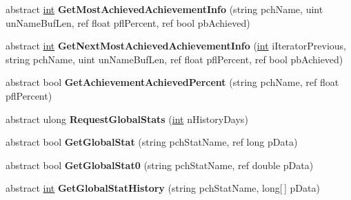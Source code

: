 \begin{DoxyCompactItemize}
\item 
\hypertarget{classValve_1_1Steamworks_1_1ISteamUserStats_adff9e5741c86a450a89ba9b7476c2410}{}abstract \hyperlink{SDL__thread_8h_a6a64f9be4433e4de6e2f2f548cf3c08e}{int} {\bfseries Get\+Most\+Achieved\+Achievement\+Info} (string pch\+Name, uint un\+Name\+Buf\+Len, ref float pfl\+Percent, ref bool pb\+Achieved)\label{classValve_1_1Steamworks_1_1ISteamUserStats_adff9e5741c86a450a89ba9b7476c2410}

\item 
\hypertarget{classValve_1_1Steamworks_1_1ISteamUserStats_ae542684ef06d0d377736624596157659}{}abstract \hyperlink{SDL__thread_8h_a6a64f9be4433e4de6e2f2f548cf3c08e}{int} {\bfseries Get\+Next\+Most\+Achieved\+Achievement\+Info} (\hyperlink{SDL__thread_8h_a6a64f9be4433e4de6e2f2f548cf3c08e}{int} i\+Iterator\+Previous, string pch\+Name, uint un\+Name\+Buf\+Len, ref float pfl\+Percent, ref bool pb\+Achieved)\label{classValve_1_1Steamworks_1_1ISteamUserStats_ae542684ef06d0d377736624596157659}

\item 
\hypertarget{classValve_1_1Steamworks_1_1ISteamUserStats_af2c9c36e3d38b2f6c7d399feb6e7148c}{}abstract bool {\bfseries Get\+Achievement\+Achieved\+Percent} (string pch\+Name, ref float pfl\+Percent)\label{classValve_1_1Steamworks_1_1ISteamUserStats_af2c9c36e3d38b2f6c7d399feb6e7148c}

\item 
\hypertarget{classValve_1_1Steamworks_1_1ISteamUserStats_a91b3928aab4006b8a242a488544d295a}{}abstract ulong {\bfseries Request\+Global\+Stats} (\hyperlink{SDL__thread_8h_a6a64f9be4433e4de6e2f2f548cf3c08e}{int} n\+History\+Days)\label{classValve_1_1Steamworks_1_1ISteamUserStats_a91b3928aab4006b8a242a488544d295a}

\item 
\hypertarget{classValve_1_1Steamworks_1_1ISteamUserStats_a92bf54658104c148284cd754d3491546}{}abstract bool {\bfseries Get\+Global\+Stat} (string pch\+Stat\+Name, ref long p\+Data)\label{classValve_1_1Steamworks_1_1ISteamUserStats_a92bf54658104c148284cd754d3491546}

\item 
\hypertarget{classValve_1_1Steamworks_1_1ISteamUserStats_a19045556c6d6d16e1ee35a12f6a13644}{}abstract bool {\bfseries Get\+Global\+Stat0} (string pch\+Stat\+Name, ref double p\+Data)\label{classValve_1_1Steamworks_1_1ISteamUserStats_a19045556c6d6d16e1ee35a12f6a13644}

\item 
\hypertarget{classValve_1_1Steamworks_1_1ISteamUserStats_a9b0073ff183b57581166d7f689639059}{}abstract \hyperlink{SDL__thread_8h_a6a64f9be4433e4de6e2f2f548cf3c08e}{int} {\bfseries Get\+Global\+Stat\+History} (string pch\+Stat\+Name, long\mbox{[}$\,$\mbox{]} p\+Data)\label{classValve_1_1Steamworks_1_1ISteamUserStats_a9b0073ff183b57581166d7f689639059}


\end{DoxyCompactItemize}
